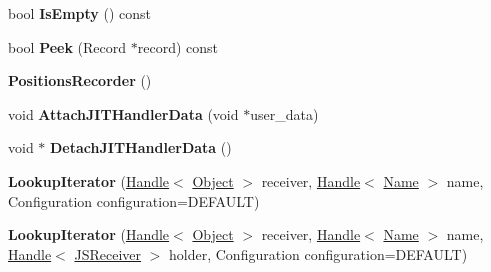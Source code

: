 \begin{DoxyCompactItemize}
\item 
bool {\bfseries Is\+Empty} () const \hypertarget{classv8_1_1internal_1_1_b_a_s_e___e_m_b_e_d_d_e_d_a7b3920ce8dc8264975a0d2380dd7acd0}{}\label{classv8_1_1internal_1_1_b_a_s_e___e_m_b_e_d_d_e_d_a7b3920ce8dc8264975a0d2380dd7acd0}

\item 
bool {\bfseries Peek} (Record $\ast$record) const \hypertarget{classv8_1_1internal_1_1_b_a_s_e___e_m_b_e_d_d_e_d_ab6b91f7e95b4b73353b26309c6a95818}{}\label{classv8_1_1internal_1_1_b_a_s_e___e_m_b_e_d_d_e_d_ab6b91f7e95b4b73353b26309c6a95818}

\item 
{\bfseries Positions\+Recorder} ()\hypertarget{classv8_1_1internal_1_1_b_a_s_e___e_m_b_e_d_d_e_d_a961112eb53cef5f35cc83164f470afbd}{}\label{classv8_1_1internal_1_1_b_a_s_e___e_m_b_e_d_d_e_d_a961112eb53cef5f35cc83164f470afbd}

\item 
void {\bfseries Attach\+J\+I\+T\+Handler\+Data} (void $\ast$user\+\_\+data)\hypertarget{classv8_1_1internal_1_1_b_a_s_e___e_m_b_e_d_d_e_d_a28f99b27f49e9cf8ab5ce822cb3ab252}{}\label{classv8_1_1internal_1_1_b_a_s_e___e_m_b_e_d_d_e_d_a28f99b27f49e9cf8ab5ce822cb3ab252}

\item 
void $\ast$ {\bfseries Detach\+J\+I\+T\+Handler\+Data} ()\hypertarget{classv8_1_1internal_1_1_b_a_s_e___e_m_b_e_d_d_e_d_a3b5a7fd0dee1c918c4fae7552b3a1396}{}\label{classv8_1_1internal_1_1_b_a_s_e___e_m_b_e_d_d_e_d_a3b5a7fd0dee1c918c4fae7552b3a1396}

\item 
{\bfseries Lookup\+Iterator} (\hyperlink{classv8_1_1internal_1_1_handle}{Handle}$<$ \hyperlink{classv8_1_1internal_1_1_object}{Object} $>$ receiver, \hyperlink{classv8_1_1internal_1_1_handle}{Handle}$<$ \hyperlink{classv8_1_1internal_1_1_name}{Name} $>$ name, Configuration configuration=D\+E\+F\+A\+U\+LT)\hypertarget{classv8_1_1internal_1_1_b_a_s_e___e_m_b_e_d_d_e_d_aaf3fc7c2dd70cc766938f73e8be67ca1}{}\label{classv8_1_1internal_1_1_b_a_s_e___e_m_b_e_d_d_e_d_aaf3fc7c2dd70cc766938f73e8be67ca1}

\item 
{\bfseries Lookup\+Iterator} (\hyperlink{classv8_1_1internal_1_1_handle}{Handle}$<$ \hyperlink{classv8_1_1internal_1_1_object}{Object} $>$ receiver, \hyperlink{classv8_1_1internal_1_1_handle}{Handle}$<$ \hyperlink{classv8_1_1internal_1_1_name}{Name} $>$ name, \hyperlink{classv8_1_1internal_1_1_handle}{Handle}$<$ \hyperlink{classv8_1_1internal_1_1_j_s_receiver}{J\+S\+Receiver} $>$ holder, Configuration configuration=D\+E\+F\+A\+U\+LT)\hypertarget{classv8_1_1internal_1_1_b_a_s_e___e_m_b_e_d_d_e_d_af813c2790f28a211ff245f6396c80384}{}\label{classv8_1_1internal_1_1_b_a_s_e___e_m_b_e_d_d_e_d_af813c2790f28a211ff245f6396c80384}


\end{DoxyCompactItemize}
